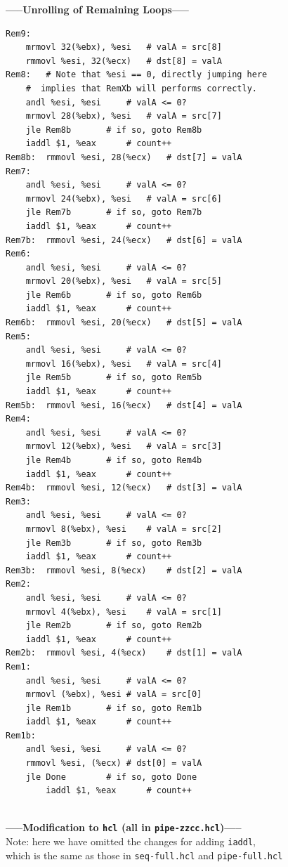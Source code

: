 \documentclass[12pt,a4paper]{article}
\begin{document}
\begin{center}
        \textbf{-----Unrolling of Remaining Loops-----}\\
\end{center}
\begin{lstlisting}
Rem9:
	mrmovl 32(%ebx), %esi	# valA = src[8]
	rmmovl %esi, 32(%ecx)	# dst[8] = valA
Rem8:	# Note that %esi == 0, directly jumping here
	#  implies that RemXb will performs correctly.
	andl %esi, %esi		# valA <= 0?
	mrmovl 28(%ebx), %esi	# valA = src[7]
	jle Rem8b		# if so, goto Rem8b
	iaddl $1, %eax		# count++
Rem8b:	rmmovl %esi, 28(%ecx)	# dst[7] = valA
Rem7:	
	andl %esi, %esi		# valA <= 0?
	mrmovl 24(%ebx), %esi	# valA = src[6]
	jle Rem7b		# if so, goto Rem7b
	iaddl $1, %eax		# count++
Rem7b:	rmmovl %esi, 24(%ecx)	# dst[6] = valA
Rem6:	
	andl %esi, %esi		# valA <= 0?
	mrmovl 20(%ebx), %esi	# valA = src[5]
	jle Rem6b		# if so, goto Rem6b
	iaddl $1, %eax		# count++
Rem6b:	rmmovl %esi, 20(%ecx)	# dst[5] = valA
Rem5:	
	andl %esi, %esi		# valA <= 0?
	mrmovl 16(%ebx), %esi	# valA = src[4]
	jle Rem5b		# if so, goto Rem5b
	iaddl $1, %eax		# count++
Rem5b:	rmmovl %esi, 16(%ecx)	# dst[4] = valA
Rem4:	
	andl %esi, %esi		# valA <= 0?
	mrmovl 12(%ebx), %esi	# valA = src[3]
	jle Rem4b		# if so, goto Rem4b
	iaddl $1, %eax		# count++
Rem4b:	rmmovl %esi, 12(%ecx)	# dst[3] = valA
Rem3:	
	andl %esi, %esi		# valA <= 0?
	mrmovl 8(%ebx), %esi	# valA = src[2]
	jle Rem3b		# if so, goto Rem3b
	iaddl $1, %eax		# count++
Rem3b:	rmmovl %esi, 8(%ecx)	# dst[2] = valA
Rem2:	
	andl %esi, %esi		# valA <= 0?
	mrmovl 4(%ebx), %esi	# valA = src[1]
	jle Rem2b		# if so, goto Rem2b
	iaddl $1, %eax		# count++
Rem2b:	rmmovl %esi, 4(%ecx)	# dst[1] = valA
Rem1:	
	andl %esi, %esi		# valA <= 0?
	mrmovl (%ebx), %esi	# valA = src[0]
	jle Rem1b		# if so, goto Rem1b
	iaddl $1, %eax		# count++
Rem1b:	
	andl %esi, %esi		# valA <= 0?
	rmmovl %esi, (%ecx)	# dst[0] = valA
	jle Done		# if so, goto Done
        iaddl $1, %eax		# count++
        
\end{lstlisting}
\begin{center}
        {\color{blue}\textbf{-----Modification to \texttt{hcl} (all in \texttt{pipe-zzcc.hcl})-----}}\\
        Note: here we have omitted the changes for adding \texttt{iaddl}, \\which is the same as those in \texttt{seq-full.hcl} and \texttt{pipe-full.hcl}
\end{center}
\end{document}
